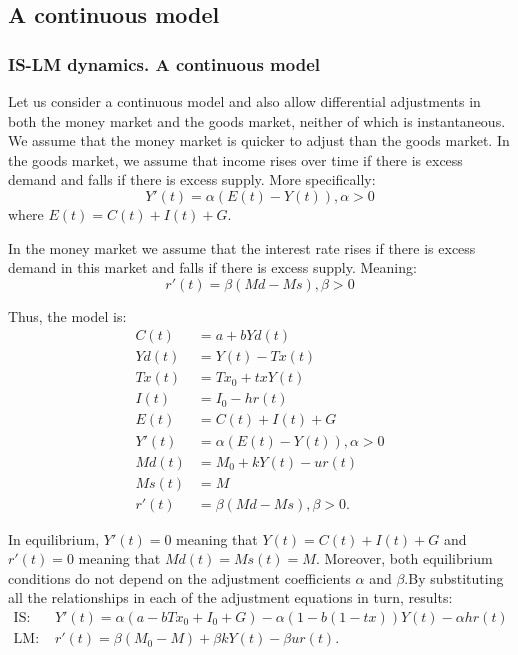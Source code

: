 \documentclass[11]{beamer}
\begin{document}
\subsection{A continuous model}
\begin{frame}
 \frametitle{IS-LM dynamics. A continuous model}
 Let us consider a continuous model and also allow differential adjustments in both the money market and the goods market, neither of which is instantaneous. We assume that the money market is quicker to adjust than the goods market. In the goods market, we assume that income rises over time if there is excess demand and falls if there is excess supply. More specifically:
\begin{equation}
 Y'(t)=\alpha(E(t)-Y(t)), \alpha>0
\end{equation}
where $E(t)=C(t)+I(t)+G$.

 In the money market we assume that the interest rate rises if there is excess demand in this market and falls if there is excess supply. Meaning:
\begin{equation}
 r'(t)=\beta(Md-Ms),\beta>0
\end{equation}
\end{frame}
\begin{frame}
 Thus, the model is:
\begin{align}
 C(t)&=a+bYd(t) \\
 Yd(t)&=Y(t)-Tx(t) \\
 Tx(t)&=Tx_{0}+txY(t)\\
 I(t)&=I_{0}-hr(t)\\
 E(t)&=C(t)+I(t)+G\\
 Y'(t)&=\alpha(E(t)-Y(t)), \alpha>0\\
 Md(t)&=M_{0}+kY(t)-ur(t)\\
 Ms(t)&=M\\
 r'(t)&=\beta(Md-Ms),\beta>0.
\end{align}
\end{frame}
\begin{frame}
 In equilibrium, $Y'(t)=0$ meaning that $Y(t)=C(t)+I(t)+G$ and $r'(t)=0$ meaning that $Md(t)=Ms(t)=M$. Moreover, both equilibrium conditions do not depend on the adjustment coefficients $\alpha$ and $\beta$.By substituting all the relationships in each of the adjustment equations in turn, results:
\begin{align*}
 \text{IS: }&Y'(t)=\alpha(a-bTx_{0}+I_{0}+G)-\alpha(1-b(1-tx))Y(t)-\alpha hr(t) \\
 \text{LM: } &r'(t)=\beta(M_{0}-M)+\beta k Y(t)-\beta ur(t).
\end{align*}

\end{frame}
\end{document}
